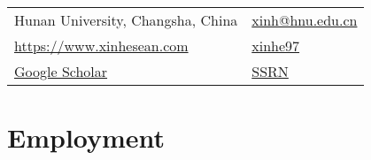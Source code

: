 \documentclass{clean_cv}
\author{Xin He}
\begin{document}
\maketitle
%
\begin{center}
\begin{tabular}{ll}
	 Hunan University, Changsha, China 
	&
	 \href{mailto:xinh@hnu.edu.cn}{ \color{orange} xinh@hnu.edu.cn } \\
	 \href{https://www.xinhesean.com}{ \color{orange} https://www.xinhesean.com} 
	&
	 \href{https://github.com/xinhe97}{ \color{orange} xinhe97 } \\
   	 \href{https://scholar.google.com/citations?user=qD8bY00AAAAJ&hl=en&authuser=2}{ \color{orange}Google Scholar }
   	&
	 \href{https://papers.ssrn.com/sol3/cf_dev/AbsByAuth.cfm?per_id=3071233}{ \color{orange} SSRN } \\
\end{tabular}
\end{center}

\vspace{-1.5em}


\section{Employment}

\begin{datetabular}{9em}

	
\end{datetabular}

\end{document}
